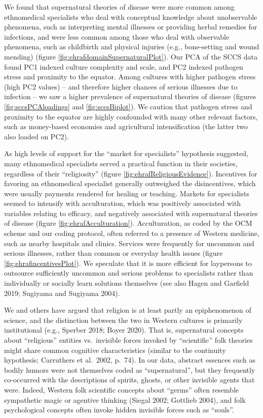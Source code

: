 \documentclass[
  11pt,
]{article}
\begin{document}
We found that supernatural theories of disease were more common among ethnomedical specialists who deal with conceptual knowledge about unobservable phenomena, such as interpreting mental illnesses or providing herbal remedies for infections, and were less common among those who deal with observable phenomena, such as childbirth and physical injuries (e.g., bone-setting and wound mending) (figure \ref{fig:ehrafdomainSupernaturalPlot}). Our PCA of the SCCS data found PC1 indexed culture complexity and scale, and PC2 indexed pathogen stress and proximity to the equator. Among cultures with higher pathogen stress (high PC2 values) -- and therefore higher chances of serious illnesses due to infection -- we saw a higher prevalence of supernatural theories of disease (figures \ref{fig:sccsPCAloadings} and \ref{fig:sccsBiplot}). We caution that pathogen stress and proximity to the equator are highly confounded with many other relevant factors, such as money-based economies and agricultural intensification (the latter two also loaded on PC2).

As high levels of support for the ``market for specialists'' hypothesis suggested, many ethnomedical specialists served a practical function in their societies, regardless of their ``religiosity'' (figure \ref{fig:ehrafReligiousEvidence}). Incentives for favoring an ethnomedical specialist generally outweighed the disincentives, which were usually payments rendered for healing or teaching. Markets for specialists seemed to intensify with acculturation, which was positively associated with variables relating to efficacy, and negatively associated with supernatural theories of disease (figure \ref{fig:ehrafAcculturation}). Acculturation, as coded by the OCM scheme and our coding protocol, often referred to a presence of Western medicine, such as nearby hospitals and clinics. Services were frequently for uncommon and serious illnesses, rather than common or everyday health issues (figure \ref{fig:ehrafincentivesPlot}). We speculate that it is more efficient for laypersons to outsource sufficiently uncommon and serious problems to specialists rather than individually or socially learn solutions themselves (see also Hagen and Garfield 2019; Sugiyama and Sugiyama 2004).

We and others have argued that religion is at least partly an epiphenomenon of science, and the distinction between the two in Western cultures is primarily institutional (e.g., Sperber 2018; Boyer 2020). That is, supernatural concepts about ``religious'' entities vs.~invisible forces invoked by ``scientific'' folk theories might share common cognitive characteristics (similar to the continuity hypothesis; Carruthers et al.~2002, p.~74). In our data, abstract essences such as bodily humors were not themselves coded as ``supernatural'', but they frequently co-occurred with the descriptions of spirits, ghosts, or other invisible agents that were. Indeed, Western folk scientific concepts about ``germs'' often resemble sympathetic magic or agentive thinking (Siegal 2002; Gottlieb 2004), and folk psychological concepts often invoke hidden invisible forces such as ``souls''.
\end{document}
